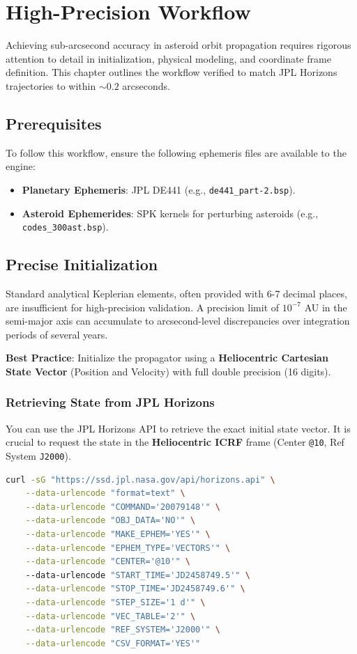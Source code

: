 \chapter{High-Precision Workflow}
\label{chap:high_precision}

Achieving sub-arcsecond accuracy in asteroid orbit propagation requires rigorous attention to detail in initialization, physical modeling, and coordinate frame definition. This chapter outlines the workflow verified to match JPL Horizons trajectories to within $\sim 0.2$ arcseconds.

\section{Prerequisites}
To follow this workflow, ensure the following ephemeris files are available to the engine:
\begin{itemize}
    \item \textbf{Planetary Ephemeris}: JPL DE441 (e.g., \texttt{de441\_part-2.bsp}).
    \item \textbf{Asteroid Ephemerides}: SPK kernels for perturbing asteroids (e.g., \texttt{codes\_300ast.bsp}).
\end{itemize}

\section{Precise Initialization}
Standard analytical Keplerian elements, often provided with 6-7 decimal places, are insufficient for high-precision validation. A precision limit of $10^{-7}$ AU in the semi-major axis can accumulate to arcsecond-level discrepancies over integration periods of several years.

\textbf{Best Practice}: Initialize the propagator using a \textbf{Heliocentric Cartesian State Vector} (Position and Velocity) with full double precision (16 digits).

\subsection{Retrieving State from JPL Horizons}
You can use the JPL Horizons API to retrieve the exact initial state vector. It is crucial to request the state in the \textbf{Heliocentric ICRF} frame (Center \texttt{@10}, Ref System \texttt{J2000}).

\begin{lstlisting}[language=bash, caption={Retrieving Heliocentric State Vector via curl}]
curl -sG "https://ssd.jpl.nasa.gov/api/horizons.api" \
    --data-urlencode "format=text" \
    --data-urlencode "COMMAND='20079148'" \
    --data-urlencode "OBJ_DATA='NO'" \
    --data-urlencode "MAKE_EPHEM='YES'" \
    --data-urlencode "EPHEM_TYPE='VECTORS'" \
    --data-urlencode "CENTER='@10'" \ 
    --data-urlencode "START_TIME='JD2458749.5'" \
    --data-urlencode "STOP_TIME='JD2458749.6'" \
    --data-urlencode "STEP_SIZE='1 d'" \
    --data-urlencode "VEC_TABLE='2'" \
    --data-urlencode "REF_SYSTEM='J2000'" \
    --data-urlencode "CSV_FORMAT='YES'"
\end{lstlisting}

